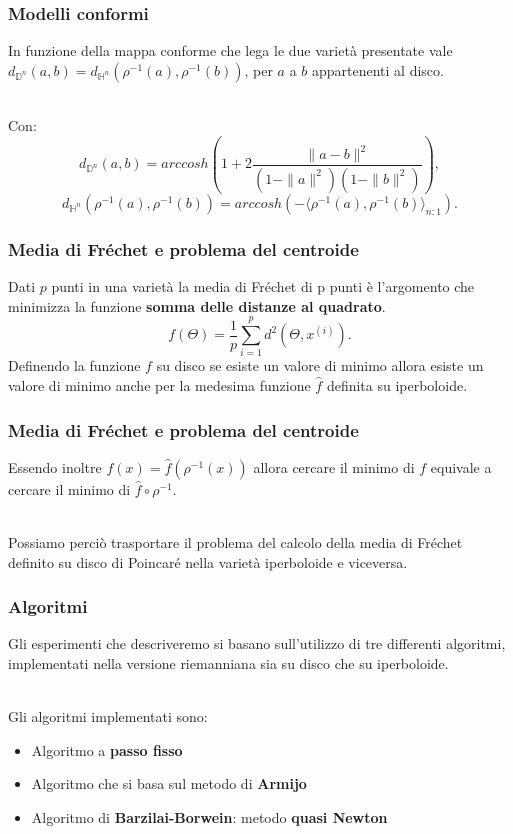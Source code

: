 \documentclass{beamer}
\begin{document}
\begin{frame}
\frametitle{Modelli conformi}
In funzione della mappa conforme che lega le due varietà presentate vale $d_{\mathbb{D}^n}(a, b) = d_{\mathbb{H}^n}(\rho^{-1}(a), \rho^{-1}(b))$, per $a$ a $b$ appartenenti al disco.\\~\

Con:
\[ d_{\mathbb{D}^n}(a,b) = arccosh(1 + 2\frac{\| a - b \|^2}{(1 - \| a \|^2)(1 - \| b \|^2)}),\]
\[ d_{\mathbb{H}^n}(\rho^{-1}(a),\rho^{-1}(b)) = arccosh(- \langle \rho^{-1}(a),\rho^{-1}(b) \rangle_{n:1}).\]
\end{frame}

\begin{frame}
\frametitle{Media di Fréchet e problema del centroide}
Dati $p$ punti in una varietà la media di Fréchet di p punti è l’argomento che minimizza la funzione \textbf{somma delle distanze al quadrato}.
\[f(\Theta) = \frac{1}{p}\sum_{i=1}^p d^2(\Theta, x^{(i)}).\]
Definendo la funzione $f$ su disco se esiste un valore di minimo allora esiste un valore di minimo anche per la medesima funzione $\hat{f}$ definita su iperboloide.
\end{frame}

\begin{frame}
\frametitle{Media di Fréchet e problema del centroide}
Essendo inoltre $f (x) = \hat{f} (\rho^{-1}(x))$ allora cercare il minimo di $f$ equivale a cercare il minimo di  $\hat{f} \circ \rho^{-1}$.\\~\

Possiamo perciò trasportare il problema del calcolo della media di Fréchet definito su disco di Poincaré nella varietà iperboloide e viceversa.
\end{frame}

\begin{frame}
\frametitle{Algoritmi}
Gli esperimenti che descriveremo si basano sull’utilizzo di tre differenti algoritmi, implementati nella versione riemanniana sia su disco che su iperboloide.\\~\

Gli algoritmi implementati sono:
\begin{itemize}
    \item Algoritmo a \textbf{passo fisso}
    \item Algoritmo che si basa sul metodo di \textbf{Armijo}
    \item Algoritmo di \textbf{Barzilai-Borwein}: metodo \textbf{quasi Newton}
\end{itemize}
\end{frame}
\end{document}
